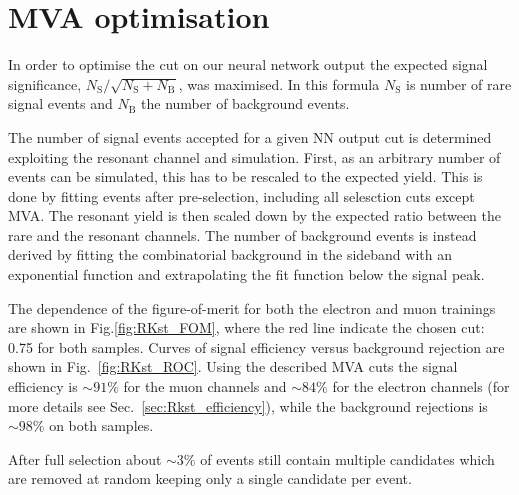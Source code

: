 \section{MVA optimisation}

In order to optimise the cut on our neural network output the expected signal significance,
$N_{\mathrm{S}}/\sqrt{N_{\mathrm{S}}+N_{\mathrm{B}}}$, was maximised.
In this formula $N_\mathrm{S}$ is number of rare signal events and $N_\mathrm{B}$ the number of background events.

The number of signal events accepted for a given NN output cut is determined exploiting the resonant channel and simulation.
First, as an arbitrary number of events can be simulated, this has to be rescaled to the expected yield.
This is done by fitting \decay{\Bz}{\Kstarz(\jpsi\to\ell^+\ell^-)} events after pre-selection,
including all selesction cuts except MVA. The resonant yield is then scaled down by the expected ratio between
the rare and the resonant channels. The number of background events is instead derived by fitting the combinatorial
background in the sideband with an exponential function and extrapolating the fit function below the signal peak.

The dependence of the figure-of-merit for both the electron and muon trainings
are shown in Fig.\ref{fig:RKst_FOM}, where the red line indicate the chosen cut: 0.75 for both samples.
Curves of signal efficiency versus background rejection are shown in Fig.~\ref{fig:RKst_ROC}.
Using the described MVA cuts the signal efficiency is $\sim 91\%$ for the muon channels
and $\sim 84\%$ for the electron channels (for more details see Sec.~\ref{sec:Rkst_efficiency}),
while the background rejections is $\sim 98\%$ on both samples.

After full selection about $\sim 3\%$ of events still contain multiple candidates
which are removed at random keeping only a single candidate per event.




